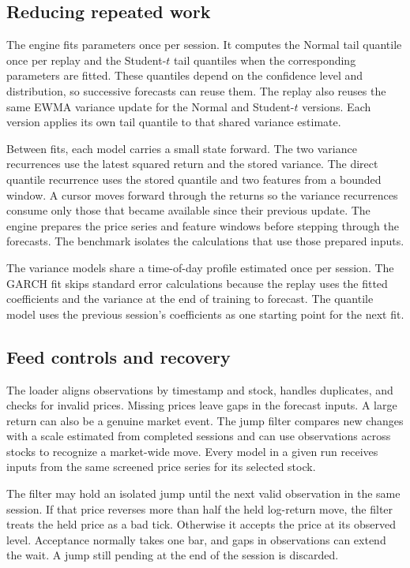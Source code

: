 \documentclass[
	12pt,				%
	openright,			%
	twoside,			%
	a4paper,
	chapter=TITLE,
	english				%
	]{abntex2}
\begin{document}
\subsection{Reducing repeated work}

The engine fits parameters once per session. It computes the Normal tail quantile once per replay and the Student-$t$ tail quantiles when the corresponding parameters are fitted. These quantiles depend on the confidence level and distribution, so successive forecasts can reuse them. The replay also reuses the same EWMA variance update for the Normal and Student-$t$ versions. Each version applies its own tail quantile to that shared variance estimate.

Between fits, each model carries a small state forward. The two variance recurrences use the latest squared return and the stored variance. The direct quantile recurrence uses the stored quantile and two features from a bounded window. A cursor moves forward through the returns so the variance recurrences consume only those that became available since their previous update. The engine prepares the price series and feature windows before stepping through the forecasts. The benchmark isolates the calculations that use those prepared inputs.

The variance models share a time-of-day profile estimated once per session. The GARCH fit skips standard error calculations because the replay uses the fitted coefficients and the variance at the end of training to forecast. The quantile model uses the previous session's coefficients as one starting point for the next fit.

\subsection{Feed controls and recovery}
\label{sec:feed-controls}

The loader aligns observations by timestamp and stock, handles duplicates, and checks for invalid prices. Missing prices leave gaps in the forecast inputs. A large return can also be a genuine market event. The jump filter compares new changes with a scale estimated from completed sessions and can use observations across stocks to recognize a market-wide move. Every model in a given run receives inputs from the same screened price series for its selected stock.

The filter may hold an isolated jump until the next valid observation in the same session. If that price reverses more than half the held log-return move, the filter treats the held price as a bad tick. Otherwise it accepts the price at its observed level. Acceptance normally takes one bar, and gaps in observations can extend the wait. A jump still pending at the end of the session is discarded.
\end{document}
